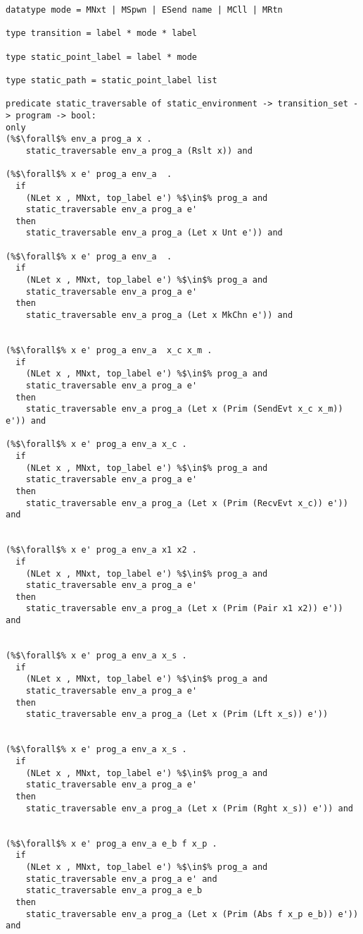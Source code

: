\documentclass{article}
\begin{document}
\begin{lstlisting}[language=logic, escapechar=\%]
datatype mode = MNxt | MSpwn | ESend name | MCll | MRtn

type transition = label * mode * label

type static_point_label = label * mode

type static_path = static_point_label list

predicate static_traversable of static_environment -> transition_set -> program -> bool:
only
(%$\forall$% env_a prog_a x .
    static_traversable env_a prog_a (Rslt x)) and

(%$\forall$% x e' prog_a env_a  .
  if
    (NLet x , MNxt, top_label e') %$\in$% prog_a and
    static_traversable env_a prog_a e'
  then
    static_traversable env_a prog_a (Let x Unt e')) and

(%$\forall$% x e' prog_a env_a  .
  if
    (NLet x , MNxt, top_label e') %$\in$% prog_a and
    static_traversable env_a prog_a e'
  then
    static_traversable env_a prog_a (Let x MkChn e')) and


(%$\forall$% x e' prog_a env_a  x_c x_m .
  if
    (NLet x , MNxt, top_label e') %$\in$% prog_a and
    static_traversable env_a prog_a e'
  then
    static_traversable env_a prog_a (Let x (Prim (SendEvt x_c x_m)) e')) and

(%$\forall$% x e' prog_a env_a x_c .
  if
    (NLet x , MNxt, top_label e') %$\in$% prog_a and
    static_traversable env_a prog_a e'
  then
    static_traversable env_a prog_a (Let x (Prim (RecvEvt x_c)) e')) and


(%$\forall$% x e' prog_a env_a x1 x2 .
  if
    (NLet x , MNxt, top_label e') %$\in$% prog_a and
    static_traversable env_a prog_a e'
  then
    static_traversable env_a prog_a (Let x (Prim (Pair x1 x2)) e')) and


(%$\forall$% x e' prog_a env_a x_s .
  if
    (NLet x , MNxt, top_label e') %$\in$% prog_a and
    static_traversable env_a prog_a e'
  then
    static_traversable env_a prog_a (Let x (Prim (Lft x_s)) e'))


(%$\forall$% x e' prog_a env_a x_s .
  if
    (NLet x , MNxt, top_label e') %$\in$% prog_a and
    static_traversable env_a prog_a e'
  then
    static_traversable env_a prog_a (Let x (Prim (Rght x_s)) e')) and


(%$\forall$% x e' prog_a env_a e_b f x_p .
  if
    (NLet x , MNxt, top_label e') %$\in$% prog_a and
    static_traversable env_a prog_a e' and
    static_traversable env_a prog_a e_b
  then
    static_traversable env_a prog_a (Let x (Prim (Abs f x_p e_b)) e')) and


\end{lstlisting}
\end{document}
